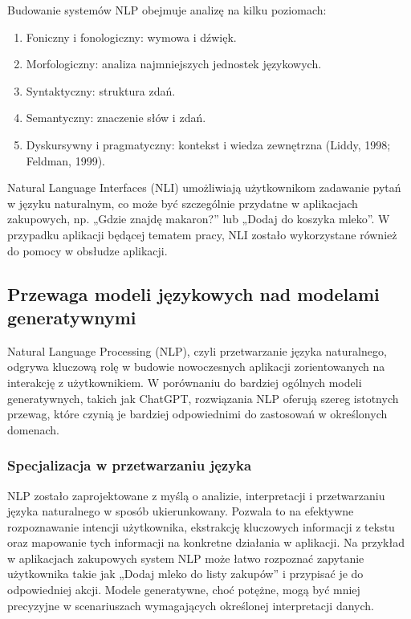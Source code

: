 Budowanie systemów NLP obejmuje analizę na kilku poziomach:
\begin{enumerate}
    \item Foniczny i fonologiczny: wymowa i dźwięk.
    \item Morfologiczny: analiza najmniejszych jednostek językowych.
    \item Syntaktyczny: struktura zdań.
    \item Semantyczny: znaczenie słów i zdań.
    \item Dyskursywny i pragmatyczny: kontekst i wiedza zewnętrzna (Liddy, 1998; Feldman, 1999). \cite{Chowdhary2020}
\end{enumerate}

Natural Language Interfaces (NLI) umożliwiają użytkownikom zadawanie pytań w języku naturalnym, co może być szczególnie przydatne w aplikacjach zakupowych, np. „Gdzie znajdę makaron?” lub „Dodaj do koszyka mleko”. W przypadku aplikacji będącej tematem pracy, NLI zostało wykorzystane również do pomocy w obsłudze aplikacji.

\subsection{Przewaga modeli językowych nad modelami generatywnymi}
Natural Language Processing (NLP), czyli przetwarzanie języka naturalnego, odgrywa kluczową rolę w budowie nowoczesnych aplikacji zorientowanych na interakcję z użytkownikiem. W porównaniu do bardziej ogólnych modeli generatywnych, takich jak ChatGPT, rozwiązania NLP oferują szereg istotnych przewag, które czynią je bardziej odpowiednimi do zastosowań w określonych domenach.

\subsubsection{Specjalizacja w przetwarzaniu języka}
NLP zostało zaprojektowane z myślą o analizie, interpretacji i przetwarzaniu języka naturalnego w sposób ukierunkowany. Pozwala to na efektywne rozpoznawanie intencji użytkownika, ekstrakcję kluczowych informacji z tekstu oraz mapowanie tych informacji na konkretne działania w aplikacji. Na przykład w aplikacjach zakupowych system NLP może łatwo rozpoznać zapytanie użytkownika takie jak „Dodaj mleko do listy zakupów” i przypisać je do odpowiedniej akcji. Modele generatywne, choć potężne, mogą być mniej precyzyjne w scenariuszach wymagających określonej interpretacji danych.

